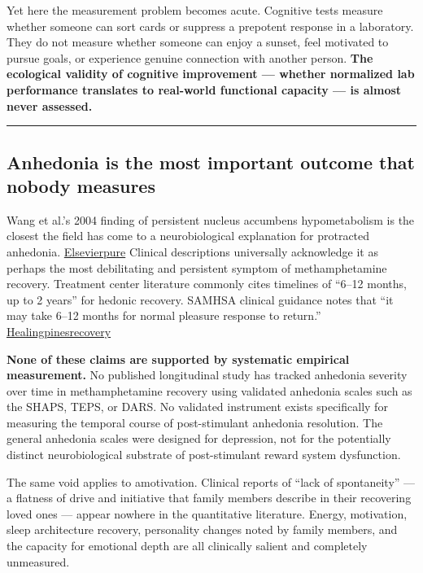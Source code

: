 Yet here the measurement problem becomes acute. Cognitive tests measure whether someone can sort cards or suppress a prepotent response in a laboratory. They do not measure whether someone can enjoy a sunset, feel motivated to pursue goals, or experience genuine connection with another person. \textbf{The ecological validity of cognitive improvement --- whether normalized lab performance translates to real-world functional capacity --- is almost never assessed.}

\begin{center}\rule{0.5\linewidth}{0.5pt}\end{center}

\subsection{Anhedonia is the most important outcome that nobody measures}\label{14_what_we_dont_know-anhedonia-is-the-most-important-outcome-that-nobody-measures}

Wang et al.'s 2004 finding of persistent nucleus accumbens hypometabolism is the closest the field has come to a neurobiological explanation for protracted anhedonia. \href{https://ohsu.elsevierpure.com/en/publications/partial-recovery-of-brain-metabolism-in-methamphetamine-abusers-a-2/}{Elsevierpure} Clinical descriptions universally acknowledge it as perhaps the most debilitating and persistent symptom of methamphetamine recovery. Treatment center literature commonly cites timelines of ``6--12 months, up to 2 years'' for hedonic recovery. SAMHSA clinical guidance notes that ``it may take 6--12 months for normal pleasure response to return.'' \href{https://healingpinesrecovery.com/stimulant-withdrawal/}{Healingpinesrecovery}

\textbf{None of these claims are supported by systematic empirical measurement.} No published longitudinal study has tracked anhedonia severity over time in methamphetamine recovery using validated anhedonia scales such as the SHAPS, TEPS, or DARS. No validated instrument exists specifically for measuring the temporal course of post-stimulant anhedonia resolution. The general anhedonia scales were designed for depression, not for the potentially distinct neurobiological substrate of post-stimulant reward system dysfunction.

The same void applies to amotivation. Clinical reports of ``lack of spontaneity'' --- a flatness of drive and initiative that family members describe in their recovering loved ones --- appear nowhere in the quantitative literature. Energy, motivation, sleep architecture recovery, personality changes noted by family members, and the capacity for emotional depth are all clinically salient and completely unmeasured.

